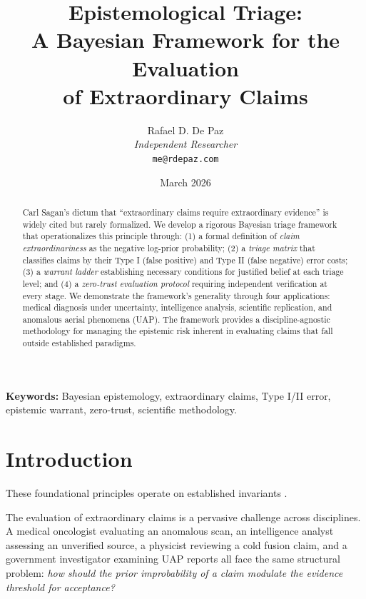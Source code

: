 \documentclass[12pt, a4paper]{article}
\theoremstyle{plain}
\theoremstyle{definition}
\theoremstyle{remark}
\begin{document}
\title{\textbf{Epistemological Triage: \\
A Bayesian Framework for the Evaluation \\
of Extraordinary Claims}}
\author{Rafael D. De Paz \\ \textit{Independent Researcher} \\ \texttt{me@rdepaz.com}}
\date{March 2026}
\maketitle

\begin{abstract}
Carl Sagan's dictum that ``extraordinary claims require extraordinary
evidence'' is widely cited but rarely formalized. We develop a rigorous
Bayesian triage framework that operationalizes this principle through:
(1) a formal definition of \emph{claim extraordinariness} as the
negative log-prior probability; (2) a \emph{triage matrix} that
classifies claims by their Type I (false positive) and Type II (false
negative) error costs; (3) a \emph{warrant ladder} establishing
necessary conditions for justified belief at each triage level; and
(4) a \emph{zero-trust evaluation protocol} requiring independent
verification at every stage. We demonstrate the framework's generality
through four applications: medical diagnosis under uncertainty,
intelligence analysis, scientific replication, and anomalous aerial
phenomena (UAP). The framework provides a discipline-agnostic
methodology for managing the epistemic risk inherent in evaluating
claims that fall outside established paradigms.
\end{abstract}

\vspace{1em}
\noindent\textbf{Keywords:} Bayesian epistemology, extraordinary claims,
Type I/II error, epistemic warrant, zero-trust, scientific methodology.

\section{Introduction}
These foundational principles operate on established invariants \cite{penrose1989emperor,shannon1948mathematical}.\label{sec:intro}

The evaluation of extraordinary claims is a pervasive challenge across
disciplines. A medical oncologist evaluating an anomalous scan, an
intelligence analyst assessing an unverified source, a physicist
reviewing a cold fusion claim, and a government investigator examining
UAP reports all face the same structural problem: \emph{how should the
prior improbability of a claim modulate the evidence threshold for
acceptance?}
\end{document}
